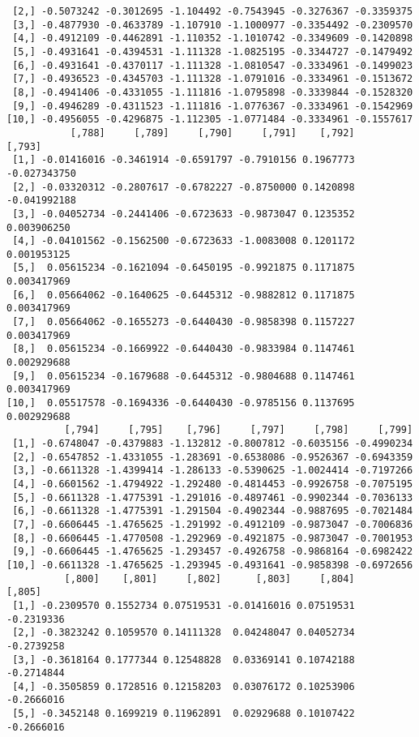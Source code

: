 \documentclass[
  letterpaper,
  DIV=11,
  numbers=noendperiod]{scrreprt}
\begin{document}
\begin{verbatim}
 [2,] -0.5073242 -0.3012695 -1.104492 -0.7543945 -0.3276367 -0.3359375
 [3,] -0.4877930 -0.4633789 -1.107910 -1.1000977 -0.3354492 -0.2309570
 [4,] -0.4912109 -0.4462891 -1.110352 -1.1010742 -0.3349609 -0.1420898
 [5,] -0.4931641 -0.4394531 -1.111328 -1.0825195 -0.3344727 -0.1479492
 [6,] -0.4931641 -0.4370117 -1.111328 -1.0810547 -0.3334961 -0.1499023
 [7,] -0.4936523 -0.4345703 -1.111328 -1.0791016 -0.3334961 -0.1513672
 [8,] -0.4941406 -0.4331055 -1.111816 -1.0795898 -0.3339844 -0.1528320
 [9,] -0.4946289 -0.4311523 -1.111816 -1.0776367 -0.3334961 -0.1542969
[10,] -0.4956055 -0.4296875 -1.112305 -1.0771484 -0.3334961 -0.1557617
           [,788]     [,789]     [,790]     [,791]    [,792]       [,793]
 [1,] -0.01416016 -0.3461914 -0.6591797 -0.7910156 0.1967773 -0.027343750
 [2,] -0.03320312 -0.2807617 -0.6782227 -0.8750000 0.1420898 -0.041992188
 [3,] -0.04052734 -0.2441406 -0.6723633 -0.9873047 0.1235352  0.003906250
 [4,] -0.04101562 -0.1562500 -0.6723633 -1.0083008 0.1201172  0.001953125
 [5,]  0.05615234 -0.1621094 -0.6450195 -0.9921875 0.1171875  0.003417969
 [6,]  0.05664062 -0.1640625 -0.6445312 -0.9882812 0.1171875  0.003417969
 [7,]  0.05664062 -0.1655273 -0.6440430 -0.9858398 0.1157227  0.003417969
 [8,]  0.05615234 -0.1669922 -0.6440430 -0.9833984 0.1147461  0.002929688
 [9,]  0.05615234 -0.1679688 -0.6445312 -0.9804688 0.1147461  0.003417969
[10,]  0.05517578 -0.1694336 -0.6440430 -0.9785156 0.1137695  0.002929688
          [,794]     [,795]    [,796]     [,797]     [,798]     [,799]
 [1,] -0.6748047 -0.4379883 -1.132812 -0.8007812 -0.6035156 -0.4990234
 [2,] -0.6547852 -1.4331055 -1.283691 -0.6538086 -0.9526367 -0.6943359
 [3,] -0.6611328 -1.4399414 -1.286133 -0.5390625 -1.0024414 -0.7197266
 [4,] -0.6601562 -1.4794922 -1.292480 -0.4814453 -0.9926758 -0.7075195
 [5,] -0.6611328 -1.4775391 -1.291016 -0.4897461 -0.9902344 -0.7036133
 [6,] -0.6611328 -1.4775391 -1.291504 -0.4902344 -0.9887695 -0.7021484
 [7,] -0.6606445 -1.4765625 -1.291992 -0.4912109 -0.9873047 -0.7006836
 [8,] -0.6606445 -1.4770508 -1.292969 -0.4921875 -0.9873047 -0.7001953
 [9,] -0.6606445 -1.4765625 -1.293457 -0.4926758 -0.9868164 -0.6982422
[10,] -0.6611328 -1.4765625 -1.293945 -0.4931641 -0.9858398 -0.6972656
          [,800]    [,801]     [,802]      [,803]     [,804]     [,805]
 [1,] -0.2309570 0.1552734 0.07519531 -0.01416016 0.07519531 -0.2319336
 [2,] -0.3823242 0.1059570 0.14111328  0.04248047 0.04052734 -0.2739258
 [3,] -0.3618164 0.1777344 0.12548828  0.03369141 0.10742188 -0.2714844
 [4,] -0.3505859 0.1728516 0.12158203  0.03076172 0.10253906 -0.2666016
 [5,] -0.3452148 0.1699219 0.11962891  0.02929688 0.10107422 -0.2666016

\end{verbatim}
\end{document}
